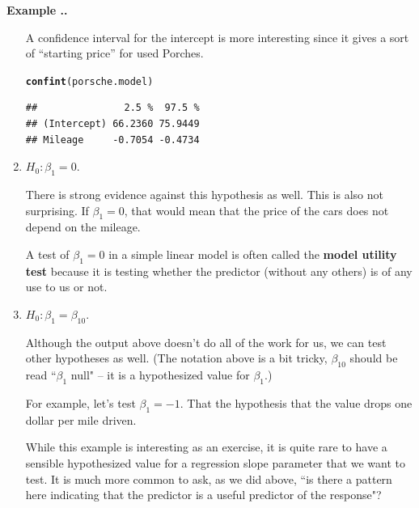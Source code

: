 \documentclass[twoside]{book}\usepackage[]{graphicx}\usepackage[]{xcolor}
\makeatletter
\newcommand{\hlstd}[1]{\textcolor[rgb]{0.345,0.345,0.345}{#1}}%
\newcommand{\hlkwd}[1]{\textcolor[rgb]{0.737,0.353,0.396}{\textbf{#1}}}%
\newenvironment{kframe}{%
 \def\at@end@of@kframe{}%
 \ifinner\ifhmode%
  \def\at@end@of@kframe{\end{minipage}}%
  \begin{minipage}{\columnwidth}%
 \fi\fi%
 \def\FrameCommand##1{\hskip\@totalleftmargin \hskip-\fboxsep
 \colorbox{shadecolor}{##1}\hskip-\fboxsep
     \hskip-\linewidth \hskip-\@totalleftmargin \hskip\columnwidth}%
 \MakeFramed {\advance\hsize-\width
   \@totalleftmargin\z@ \linewidth\hsize
   \@setminipage}}%
 {\par\unskip\endMakeFramed%
 \at@end@of@kframe}
\newenvironment{knitrout}{}{} %
\def\term#1{\textbf{#1}}
\newcounter{example}[section]
\newenvironment{example}%
{\refstepcounter{example}%
\textbf{Example \thesection.\arabic{example}. }}%
{}
\makeatother
\begin{document}
\begin{example}
\begin{enumerate}
		A confidence interval for the intercept is more interesting since it gives a sort 
		of ``starting price'' for used Porches.
\begin{knitrout}
\color{fgcolor}\begin{kframe}
\begin{alltt}
\hlkwd{confint}\hlstd{(porsche.model)}
\end{alltt}
\begin{verbatim}
##               2.5 %  97.5 %
## (Intercept) 66.2360 75.9449
## Mileage     -0.7054 -0.4734
\end{verbatim}
\end{kframe}
\end{knitrout}


	\item
		$H_0: \beta_1 = 0$.

		There is strong evidence against this hypothesis as well.  This is also not surprising.
		If $\beta_1 = 0$, that would mean that the price of the cars does not depend on the mileage.

		A test of $\beta_1 = 0$ in a simple linear model is often called the \term{model utility test}
		because it is testing whether the predictor (without any others) is of any use to us or not.
		

	\item
		$H_0: \beta_1 = \beta_{10}$.

		Although the output above doesn't do all of the work for us, we can test other
		hypotheses as well.  (The notation above is a bit tricky, $\beta_{10}$ should be read
		``$\beta_1$ null" -- it is a hypothesized value for $\beta_1$.)
		
		For example, let's test $\beta_1 = -1$.  That the hypothesis that the value 
		drops one dollar per mile driven.
    
    While this example is interesting as an exercise, it is quite rare to have a sensible hypothesized value for a regression slope parameter that we want to test.  It is much more common to ask, as we did above, ``is there a pattern here indicating that the predictor is a useful predictor of the response"?


\end{enumerate}
\end{example}
\end{document}

